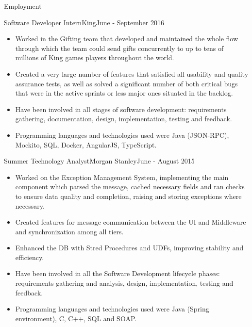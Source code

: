 \documentclass[]{cv}
\begin{document}
\begin{cvsection}{Employment}
		\begin{cvsubsection}{Software Developer Intern}{King}{June - September 2016}
			\begin{itemize}
				\item Worked in the Gifting team that developed and maintained the whole flow through which the team could send gifts concurrently to up to tens of 
					millions of King games players throughout the world.
				\item Created a very large number of features that satisfied all usability and quality assurance tests, as well as solved a significant number of 
					both critical bugs that were in the active sprints or less major ones situated in the backlog.
				\item Have been involved in all stages of software development: requirements gathering, documentation, design, implementation, testing and feedback.
				\item Programming languages and technologies used were Java (JSON-RPC), Mockito, SQL, Docker, AngularJS, TypeScript.
			\end{itemize}
		\end{cvsubsection}

		\begin{cvsubsection}{Summer Technology Analyst}{Morgan Stanley}{June - August 2015}
			\begin{itemize}
				\item Worked on the Exception Management System, implementing the main component which parsed the message, cached necessary fields and ran checks to ensure 
					data quality and completion, raising and storing exceptions where necessary.
				\item Created features for message communication between the UI and Middleware and synchronization among all tiers.	
				\item Enhanced the DB with Stred Procedures and UDFs, improving stability and efficiency.
				\item Have been involved in all the Software Development lifecycle phases: requirements gathering and analysis, design,
					implementation, testing and feedback.
				\item Programming languages and technologies used were Java (Spring environment), C, C++, SQL and SOAP.
			\end{itemize}
		\end{cvsubsection}


\end{cvsection}
\end{document}
